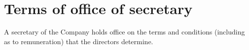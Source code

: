 \section{Terms of office of secretary}

A secretary of the Company holds office on the terms and conditions (including as to remuneration) that the directors determine. 
